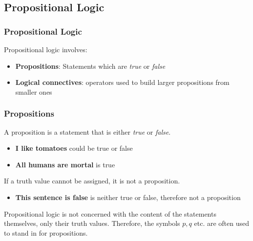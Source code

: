 \documentclass{article}
\begin{document}
\subsection{Propositional Logic}
\subsubsection{Propositional Logic}
Propositional logic involves:
\begin{itemize}
    \item \textbf{Propositions}: Statements which are \emph{true} or \emph{false}
    \item \textbf{Logical connectives}: operators used to build larger propositions from smaller ones
\end{itemize}
%
\subsubsection{Propositions}
A proposition is a statement that is either \emph{true} or \emph{false}.
\begin{itemize}
    \item \textbf{I like tomatoes} could be true or false
    \item \textbf{All humans are mortal} is true
\end{itemize}
If a truth value cannot be assigned, it is not a proposition.
\begin{itemize}
    \item \textbf{This sentence is false} is neither true or false, therefore not a proposition
\end{itemize}
\begin{tcolorbox}[title=Note]
    Propositional logic is not concerned with the content of the statements themselves, only their truth values.
    Therefore, the symbols \(p, q\) etc. are often used to stand in for propositions.
\end{tcolorbox}
%
\end{document}
